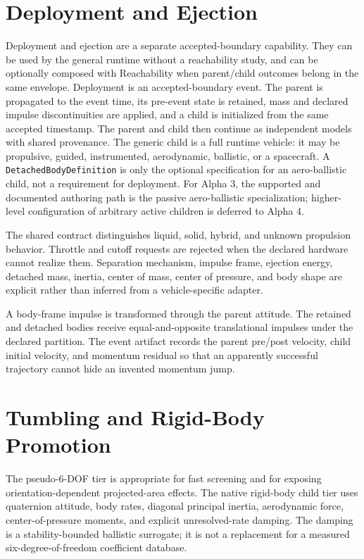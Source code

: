\section{Deployment and Ejection}\label{sec:compiled-deployment}

Deployment and ejection are a separate accepted-boundary capability. They can
be used by the general runtime without a reachability study, and can be
optionally composed with Reachability when parent/child outcomes belong in the
same envelope. Deployment is an accepted-boundary event. The parent is propagated to the event
time, its pre-event state is retained, mass and declared impulse discontinuities
are applied, and a child is initialized from the same accepted timestamp. The
parent and child then continue as independent models with shared provenance.
The generic child is a full runtime vehicle: it may be propulsive, guided,
instrumented, aerodynamic, ballistic, or a spacecraft. A
\texttt{DetachedBodyDefinition} is only the optional specification for an
aero-ballistic child, not a requirement for deployment.
For Alpha 3, the supported and documented authoring path is the passive
aero-ballistic specialization; higher-level configuration of arbitrary active
children is deferred to Alpha 4.

The shared contract distinguishes liquid, solid, hybrid, and unknown
propulsion behavior. Throttle and cutoff requests are rejected when the
declared hardware cannot realize them. Separation mechanism, impulse frame,
ejection energy, detached mass, inertia, center of mass, center of pressure,
and body shape are explicit rather than inferred from a vehicle-specific
adapter.

A body-frame impulse is transformed through the parent attitude. The retained
and detached bodies receive equal-and-opposite translational impulses under
the declared partition. The event artifact records the parent pre/post
velocity, child initial velocity, and momentum residual so that an apparently
successful trajectory cannot hide an invented momentum jump.

\section{Tumbling and Rigid-Body Promotion}\label{sec:compiled-tumbling}

The pseudo-6-DOF tier is appropriate for fast screening and for exposing
orientation-dependent projected-area effects. The native rigid-body child tier
uses quaternion attitude, body rates, diagonal principal inertia, aerodynamic
force, center-of-pressure moments, and explicit unresolved-rate damping. The
damping is a stability-bounded ballistic surrogate; it is not a replacement
for a measured six-degree-of-freedom coefficient database.

